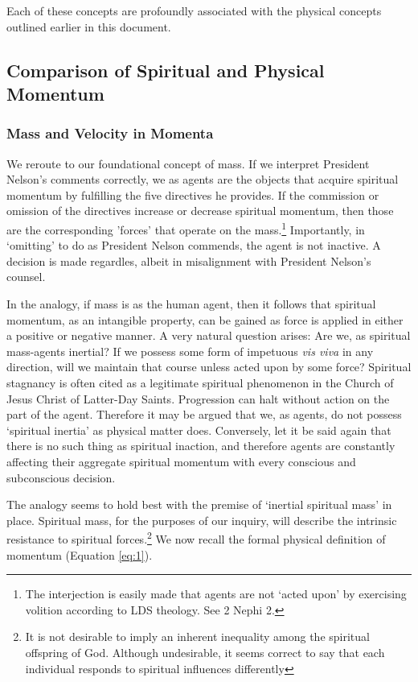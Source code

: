 \documentclass{article}
\begin{document}
            Each of these concepts are profoundly associated with the physical concepts outlined earlier in this document.

        \subsection{Comparison of Spiritual and Physical Momentum}
            \subsubsection{Mass and Velocity in Momenta}
                We reroute to our foundational concept of mass. If we interpret President Nelson's comments correctly, we as agents are the objects that acquire spiritual momentum by fulfilling the five directives he provides.
                If the commission or omission of the directives increase or decrease spiritual momentum, then those are the corresponding 'forces' that operate on the mass.\footnote{The interjection is easily made that agents are not `acted upon' by exercising volition according to LDS theology. See 2 Nephi 2.}
                Importantly, in `omitting' to do as President Nelson commends, the agent is not inactive. A decision is made regardles, albeit in misalignment with President Nelson's counsel. 

                In the analogy, if mass is as the human agent, then it follows that spiritual momentum, as an intangible property, can be gained as force is applied in either a positive or negative manner.
                A very natural question arises: Are we, as spiritual mass-agents inertial? If we possess some form of impetuous \textit{vis viva} in any direction, will we maintain that course unless acted upon by some force?
                Spiritual stagnancy is often cited as a legitimate spiritual phenomenon in the Church of Jesus Christ of Latter-Day Saints. Progression can halt without action on the part of the agent. Therefore it may be argued that we, as agents, do not possess `spiritual inertia' as physical matter does. 
                Conversely, let it be said again that there is no such thing as spiritual inaction, and therefore agents are constantly affecting their aggregate spiritual momentum with every conscious and subconscious decision.

                The analogy seems to hold best with the premise of `inertial spiritual mass' in place. Spiritual mass, for the purposes of our inquiry, will describe the intrinsic resistance to spiritual forces.\footnote{It is not desirable to imply an inherent inequality among the spiritual offspring of God. Although undesirable, it seems correct to say that each individual responds to spiritual influences differently}
                We now recall the formal physical definition of momentum (Equation \ref{eq:1}).
\end{document}
